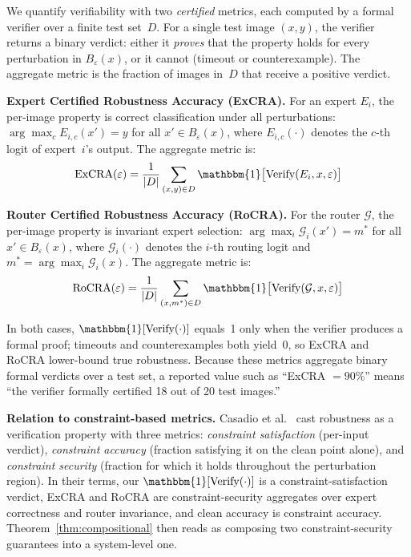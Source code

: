 \documentclass[runningheads]{llncs}
\begin{document}
We quantify verifiability with two \emph{certified} metrics, each computed by a formal verifier over a finite test set~$D$. For a single test image $(x,y)$, the verifier returns a binary verdict: either it \emph{proves} that the property holds for every perturbation in $B_\varepsilon(x)$, or it cannot (timeout or counterexample). The aggregate metric is the fraction of images in~$D$ that receive a positive verdict.

\textbf{Expert Certified Robustness Accuracy (ExCRA).} For an expert $E_i$, the per-image property is correct classification under all perturbations: $\arg\max_c E_{i,c}(x') = y$ for all $x' \in B_\varepsilon(x)$, where $E_{i,c}(\cdot)$ denotes the $c$-th logit of expert~$i$'s output. The aggregate metric is:
\begin{equation}
    \text{ExCRA}(\varepsilon) = \frac{1}{|D|} \sum_{(x,y) \in D} \mathbbm{1}\bigl[\text{Verify}(E_i, x, \varepsilon)\bigr]
\end{equation}

\textbf{Router Certified Robustness Accuracy (RoCRA).} For the router $\mathcal{G}$, the per-image property is invariant expert selection: $\arg\max_i \mathcal{G}_i(x') = m^*$ for all $x' \in B_\varepsilon(x)$, where $\mathcal{G}_i(\cdot)$ denotes the $i$-th routing logit and $m^* = \arg\max_i \mathcal{G}_i(x)$. The aggregate metric is:
\begin{equation}
    \text{RoCRA}(\varepsilon) = \frac{1}{|D|} \sum_{(x,m^*) \in D} \mathbbm{1}\bigl[\text{Verify}(\mathcal{G}, x, \varepsilon)\bigr]
\end{equation}

In both cases, $\mathbbm{1}[\text{Verify}(\cdot)]$ equals~1 only when the verifier produces a formal proof; timeouts and counterexamples both yield~0, so ExCRA and RoCRA lower-bound true robustness. Because these metrics aggregate binary formal verdicts over a test set, a reported value such as ``ExCRA $= 90\%$'' means ``the verifier formally certified 18 out of 20 test images.''\!

\textbf{Relation to constraint-based metrics.} Casadio et al.~\cite{casadio2022} cast robustness as a verification property with three metrics: \emph{constraint satisfaction} (per-input verdict), \emph{constraint accuracy} (fraction satisfying it on the clean point alone), and \emph{constraint security} (fraction for which it holds throughout the perturbation region). In their terms, our $\mathbbm{1}[\text{Verify}(\cdot)]$ is a constraint-satisfaction verdict, ExCRA and RoCRA are constraint-security aggregates over expert correctness and router invariance, and clean accuracy is constraint accuracy. Theorem~\ref{thm:compositional} then reads as composing two constraint-security guarantees into a system-level one.
\end{document}
